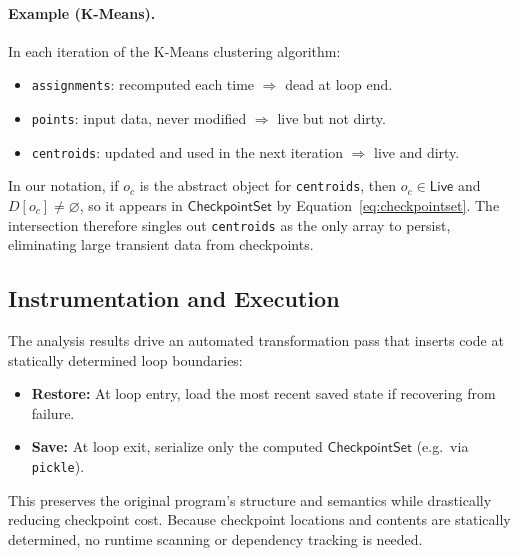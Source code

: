 \paragraph{Example (K-Means).}
In each iteration of the K-Means clustering algorithm:
\begin{itemize}
    \item \texttt{assignments}: recomputed each time $\Rightarrow$ dead at loop end.
    \item \texttt{points}: input data, never modified $\Rightarrow$ live but not dirty.
    \item \texttt{centroids}: updated and used in the next iteration $\Rightarrow$ live and dirty.
\end{itemize}
In our notation, if $o_c$ is the abstract object for \texttt{centroids}, then
$o_c \in \mathsf{Live}$ and $D[o_c] \neq \varnothing$, so it appears in
$\mathsf{CheckpointSet}$ by Equation~\eqref{eq:checkpointset}.
The intersection therefore singles out \texttt{centroids} as the only array to persist,
eliminating large transient data from checkpoints.

\subsection{Instrumentation and Execution}

The analysis results drive an automated transformation pass that inserts code at statically determined loop boundaries:
\begin{itemize}
    \item \textbf{Restore:} At loop entry, load the most recent saved state if recovering from failure.
    \item \textbf{Save:} At loop exit, serialize only the computed $\mathsf{CheckpointSet}$ (e.g.\ via \texttt{pickle}).
\end{itemize}
This preserves the original program’s structure and semantics while drastically reducing checkpoint cost. Because checkpoint locations and contents are statically determined, no runtime scanning or dependency tracking is needed.
